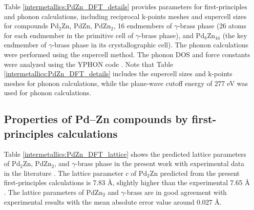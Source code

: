 Table \ref{intermetallics:PdZn_DFT_details} provides parameters for first-principles and phonon calculations, including reciprocal k-points meshes and supercell sizes for compounds Pd$_2$Zn, PdZn, PdZn$_2$, 16 endmembers of $\gamma$-brass phase (26 atoms for each endmember in the primitive cell of $\gamma$-brass phase), and Pd$_8$Zn$_{44}$ (the key endmember of $\gamma$-brass phase in its crystallographic cell). The phonon calculations were performed using the supercell method. The phonon DOS and force constants were analyzed using the YPHON code \cite{wang2014yphon}. Note that Table \ref{intermetallics:PdZn_DFT_details} includes the supercell sizes and k-points meshes for phonon calculations, while the plane-wave cutoff energy of 277 eV was used for phonon calculations. 

\subsection{Properties of Pd–Zn compounds by first-principles calculations} \label{intermetallics:ssec:PdZndft}
Table \ref{intermetallics:PdZn_DFT_lattice} shows the predicted lattice parameters of Pd$_2$Zn, PdZn$_2$, and $\gamma$-brass phase in the present work with experimental data in the literature \cite{strom1969x, stadelmaier1961ternare, neumann1978structural, gourdon2006zn1}. The lattice parameter $c$ of Pd$_2$Zn predicted from the present first-principles calculations is 7.83 \r{A}, slightly higher than the experimental 7.65 \r{A} \cite{stadelmaier1961ternare}. The lattice parameters of PdZn$_2$ and $\gamma$-brass are in good agreement with experimental results with the mean absolute error value around 0.027 \r{A}. 

